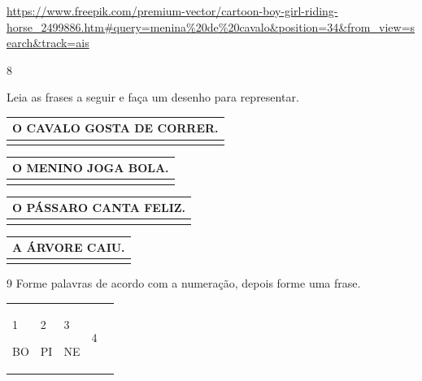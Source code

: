 {{\url{https://www.freepik.com/premium-vector/cartoon-boy-girl-riding-horse_2499886.htm\#query=menina\%20de\%20cavalo\&position=34\&from_view=search\&track=ais}

\num{8}

Leia as frases a seguir e faça um desenho para representar.


\begin{longtable}[]{@{}l@{}}
\toprule
O CAVALO GOSTA DE CORRER.\tabularnewline
\midrule
\endhead
\tabularnewline
\bottomrule
\end{longtable}

\begin{longtable}[]{@{}l@{}}
\toprule
O MENINO JOGA BOLA.\tabularnewline
\midrule
\endhead
\tabularnewline
\bottomrule
\end{longtable}

\begin{longtable}[]{@{}l@{}}
\toprule
O PÁSSARO CANTA FELIZ.\tabularnewline
\midrule
\endhead
\tabularnewline
\bottomrule
\end{longtable}

\begin{longtable}[]{@{}l@{}}
\toprule
A ÁRVORE CAIU.\tabularnewline
\midrule
\endhead
\tabularnewline
\bottomrule
\end{longtable}


\num{9} Forme palavras de acordo com a numeração, depois forme uma frase.


\begin{longtable}[]{@{}lllll@{}}
\toprule
\begin{minipage}[b]{0.19\columnwidth}\raggedright\strut
1

BO\strut
\end{minipage} & \begin{minipage}[b]{0.19\columnwidth}\raggedright\strut
2

PI\strut
\end{minipage} & \begin{minipage}[b]{0.19\columnwidth}\raggedright\strut
3

NE\strut
\end{minipage} & \begin{minipage}[b]{0.19\columnwidth}\raggedright\strut
4


\end{minipage}
\end{longtable}}}
